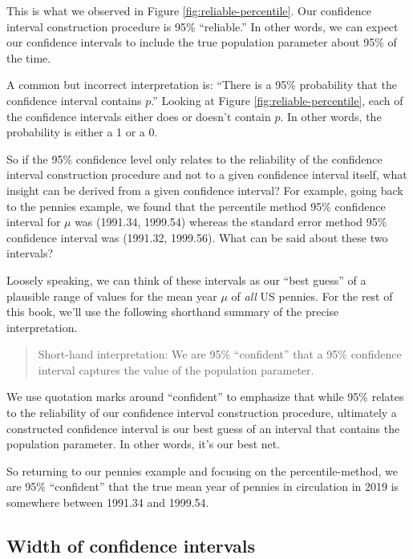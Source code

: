 \documentclass[
]{book}
\begin{document}
This is what we observed in Figure \ref{fig:reliable-percentile}. Our confidence interval construction procedure is 95\% ``reliable.'' In other words, we can expect our confidence intervals to include the true population parameter about 95\% of the time.

A common but incorrect interpretation is: ``There is a 95\% probability that the confidence interval contains \(p\).'' Looking at Figure \ref{fig:reliable-percentile}, each of the confidence intervals either does or doesn't contain \(p\). In other words, the probability is either a 1 or a 0.

So if the 95\% confidence level only relates to the reliability of the confidence interval construction procedure and not to a given confidence interval itself, what insight can be derived from a given confidence interval? For example, going back to the pennies example, we found that the percentile method 95\% confidence interval for \(\mu\) was (1991.34, 1999.54) whereas the standard error method 95\% confidence interval was (1991.32, 1999.56). What can be said about these two intervals?

Loosely speaking, we can think of these intervals as our ``best guess'' of a plausible range of values for the mean year \(\mu\) of \emph{all} US pennies. For the rest of this book, we'll use the following shorthand summary of the precise interpretation.

\begin{quote}
Short-hand interpretation: We are 95\% ``confident'' that a 95\% confidence interval captures the value of the population parameter.
\end{quote}

We use quotation marks around ``confident'' to emphasize that while 95\% relates to the reliability of our confidence interval construction procedure, ultimately a constructed confidence interval is our best guess of an interval that contains the population parameter. In other words, it's our best net.

So returning to our pennies example and focusing on the percentile-method, we are 95\% ``confident'' that the true mean year of pennies in circulation in 2019 is somewhere between 1991.34 and 1999.54.

\hypertarget{ci-width}{%
\subsection{Width of confidence intervals}\label{ci-width}}
\end{document}

